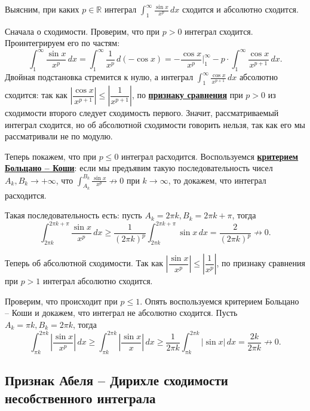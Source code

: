 \begin{example}
	Выясним, при каких \(p \in \mathbb{R}\) интеграл \(\displaystyle \int_1^{\infty} \frac{\sin x}{x^p} \, dx\) сходится и абсолютно сходится.
	
	Сначала о сходимости. Проверим, что при \(p > 0\) интеграл сходится. Проинтегрируем его по частям: \[
	\int_1^{\infty} \frac{\sin x}{x^p} \, dx = \int_{1}^{\infty} \frac{1}{x^p} \, d(-\cos x) = -\frac{\cos x}{x^p} \bigg|_1^\infty - p \cdot \int_{1}^{\infty} \frac{\cos x}{x^{p+1}} \, dx.
	\]
	Двойная подстановка стремится к нулю, а интеграл \(\displaystyle \int_{1}^{\infty} \frac{\cos x}{x^{p+1}} \, dx\) абсолютно сходится: так как \(\left|\dfrac{\cos x}{x^{p+1}} \right| \leqslant \left|\dfrac{1}{x^{p+1}} \right|\), по \hyperlink{priz}{\bfseries признаку сравнения} при \(p > 0\) из сходимости второго следует сходимость первого. Значит, рассматриваемый интеграл сходится, но об абсолютной сходимости говорить нельзя, так как его мы рассматривали не по модулю.
	
	Теперь покажем, что при \(p \leqslant 0\) интеграл расходится. Воспользуемся \hyperlink{Критерий Больцано -- Коши сходимости несобственного интеграла}{\bfseries критерием Больцано -- Коши}: если мы предъявим такую последовательность чисел \(A_k, B_k \to +\infty\), что \(\displaystyle \int_{A_k}^{B_k} \frac{\sin x}{x^p} \not\to 0\) при \(k \to \infty\), то докажем, что интеграл расходится.
	
	Такая последовательность есть: пусть \(A_k = 2\pi k, B_k = 2\pi k + \pi\), тогда \[
	\int_{2\pi k}^{2\pi k + \pi} \frac{\sin x}{x^p} \, dx \geqslant \frac{1}{(2\pi k)^p} \int_{2\pi k}^{2\pi k + \pi} \sin x \, dx = \frac{2}{(2\pi k)^p} \not\to 0.
	\]
	
	Теперь об абсолютной сходимости. Так как \(\left|\dfrac{\sin x}{x^p}\right| \leqslant \left|\dfrac{1}{x^p}\right|\), по признаку сравнения при \(p > 1\) интеграл абсолютно сходится.
	
	Проверим, что происходит при \(p \leqslant 1\). Опять воспользуемся критерием Больцано -- Коши и докажем, что интеграл не абсолютно сходится. Пусть \(A_k = \pi k, B_k = 2 \pi k\), тогда \[
	\int_{\pi k}^{2\pi k} \left|\frac{\sin x}{x^p} \right| \, dx \geqslant \int_{\pi k}^{2\pi k} \left|\frac{\sin x}{x} \right| \, dx \geqslant \frac{1}{2\pi k} \int_{\pi k}^{2\pi k} \left|\sin x \right| \, dx = \frac{2k}{2\pi k} \not\to 0.
	\]
\end{example}

\subsection{Признак Абеля -- Дирихле сходимости несобственного интеграла}

